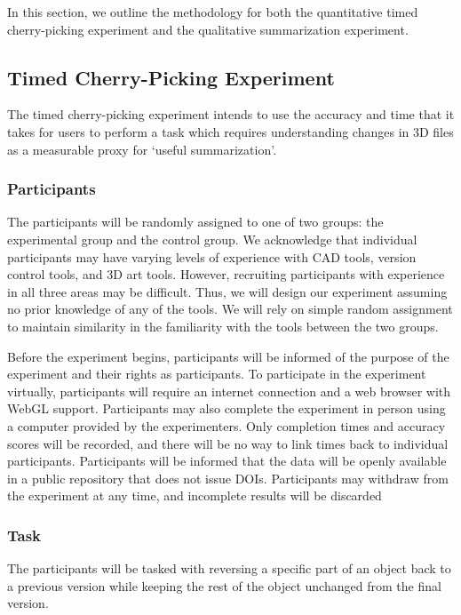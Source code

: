 \documentclass[sigconf,authorversion,nonacm]{acmart}
\begin{document}
In this section, we outline the methodology for both the quantitative timed cherry-picking experiment and the qualitative summarization experiment.

\subsection{Timed Cherry-Picking Experiment}

The timed cherry-picking experiment intends to use the accuracy and time that it takes for users to perform a task which requires understanding changes in 3D files as a measurable proxy for `useful summarization'.

\subsubsection{Participants}

The participants will be randomly assigned to one of two groups: the experimental group and the control group.
We acknowledge that individual participants may have varying levels of experience with CAD tools, version control tools, and 3D art tools.
However, recruiting participants with experience in all three areas may be difficult. Thus, we will design our experiment assuming no prior knowledge of any of the tools.
We will rely on simple random assignment to maintain similarity in the familiarity with the tools between the two groups.

Before the experiment begins, participants will be informed of the purpose of the experiment and their rights as participants.
To participate in the experiment virtually, participants will require an internet connection and a web browser with WebGL support.
Participants may also complete the experiment in person using a computer provided by the experimenters. Only completion times and accuracy scores will be recorded, and there will be no way to link times back to individual participants.
Participants will be informed that the data will be openly available in a public repository that does not issue DOIs. Participants may withdraw from the experiment at any time, and incomplete results will be discarded

\subsubsection{Task}

The participants will be tasked with reversing a specific part of an object back to a previous version while keeping the rest of the object unchanged from the final version.
\end{document}

